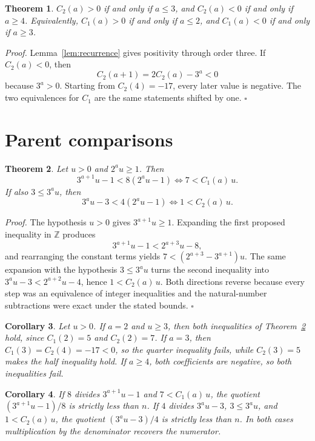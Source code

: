 \documentclass[11pt,letterpaper]{article}
\newcommand{\Z}{\mathbb{Z}}
\newtheorem{theorem}{Theorem}
\newtheorem{corollary}[theorem]{Corollary}
\newenvironment{proof}{\noindent\textit{Proof.}}{\hfill\(\square\)}
\begin{document}
\begin{theorem}
\label{thm:signs}
\(C_2(a)>0\) if and only if \(a\le 3\), and \(C_2(a)<0\) if and only if \(a\ge 4\). Equivalently, \(C_1(a)>0\) if and only if \(a\le 2\), and \(C_1(a)<0\) if and only if \(a\ge 3\).
\end{theorem}

\begin{proof}
Lemma~\ref{lem:recurrence} gives positivity through order three. If \(C_2(a)<0\), then
\[
C_2(a+1)=2C_2(a)-3^a<0
\]
because \(3^a>0\). Starting from \(C_2(4)=-17\), every later value is negative. The two equivalences for \(C_1\) are the same statements shifted by one.
\end{proof}

\section{Parent comparisons}

\begin{theorem}
\label{thm:comparisons}
Let \(u>0\) and \(2^a u\ge 1\). Then
\[
3^{a+1}u-1<8(2^a u-1)\iff 7<C_1(a)\,u.
\]
If also \(3\le 3^a u\), then
\[
3^a u-3<4(2^a u-1)\iff 1<C_2(a)\,u.
\]
\end{theorem}

\begin{proof}
The hypothesis \(u>0\) gives \(3^{a+1}u\ge 1\). Expanding the first proposed inequality in \(\Z\) produces
\[
3^{a+1}u-1<2^{a+3}u-8,
\]
and rearranging the constant terms yields \(7<(2^{a+3}-3^{a+1})u\). The same expansion with the hypothesis \(3\le 3^a u\) turns the second inequality into \(3^a u-3<2^{a+2}u-4\), hence \(1<C_2(a)\,u\). Both directions reverse because every step was an equivalence of integer inequalities and the natural-number subtractions were exact under the stated bounds.
\end{proof}

\begin{corollary}
\label{cor:ranges}
Let \(u>0\). If \(a=2\) and \(u\ge 3\), then both inequalities of Theorem~\ref{thm:comparisons} hold, since \(C_1(2)=5\) and \(C_2(2)=7\). If \(a=3\), then \(C_1(3)=C_2(4)=-17<0\), so the quarter inequality fails, while \(C_2(3)=5\) makes the half inequality hold. If \(a\ge 4\), both coefficients are negative, so both inequalities fail.
\end{corollary}

\begin{corollary}
\label{cor:parents}
If \(8\) divides \(3^{a+1}u-1\) and \(7<C_1(a)\,u\), the quotient \((3^{a+1}u-1)/8\) is strictly less than \(n\). If \(4\) divides \(3^a u-3\), \(3\le 3^a u\), and \(1<C_2(a)\,u\), the quotient \((3^a u-3)/4\) is strictly less than \(n\). In both cases multiplication by the denominator recovers the numerator.
\end{corollary}
\end{document}
